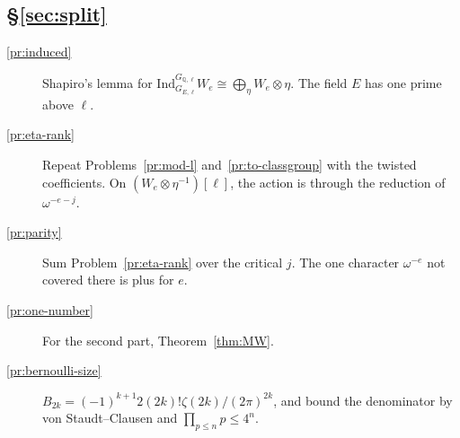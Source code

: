 \documentclass[reqno]{amsart}
\theoremstyle{definition}
\theoremstyle{plain}
\theoremstyle{remark}
\newcommand{\Q}{\mathbb{Q}}
\begin{document}
\subsection*{\S\ref{sec:split}}
\begin{description}
\item[\ref{pr:induced}] Shapiro's lemma for \(\mathrm{Ind}_{G_{E,\ell}}^{G_{\Q,\ell}} W_e \cong \bigoplus_\eta W_e \otimes \eta\).  The field \(E\) has one prime above \(\ell\).
\item[\ref{pr:eta-rank}] Repeat Problems~\ref{pr:mod-l} and~\ref{pr:to-classgroup} with the twisted coefficients.  On \((W_e\otimes\eta^{-1})[\ell]\), the action is through the reduction of \(\omega^{-e-j}\).
\item[\ref{pr:parity}] Sum Problem~\ref{pr:eta-rank} over the critical \(j\).  The one character \(\omega^{-e}\) not covered there is plus for \(e\).
\item[\ref{pr:one-number}] For the second part, Theorem~\ref{thm:MW}.
\item[\ref{pr:bernoulli-size}] \(B_{2k} = (-1)^{k+1} 2 (2k)! \zeta(2k)/(2\pi)^{2k}\), and bound the denominator by von Staudt--Clausen and \(\prod_{p \le n} p \le 4^n\).
\end{description}
\end{document}
